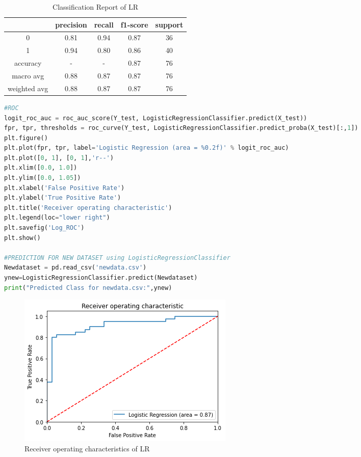 \begin{table}[h!]
    \centering
    \caption{Classification Report of LR}
    \label{tab:_ex_tab}
    \begin{tabular}{ccccc}     
        \toprule
            &  precision & recall & f1-score & support \\
        \midrule
        0 & 0.81 & 0.94 & 0.87 & 36 \\
        1 & 0.94 & 0.80 & 0.86 & 40 \\

        accuracy & - & - & 0.87 & 76 \\
        macro avg & 0.88 & 0.87 & 0.87 & 76 \\
        weighted avg & 0.88 & 0.87 & 0.87 & 76 \\
        \bottomrule
    \end{tabular}
\end{table}

\begin{lstlisting}[language=Python, label=list:python_code_ex]
#ROC
logit_roc_auc = roc_auc_score(Y_test, LogisticRegressionClassifier.predict(X_test))
fpr, tpr, thresholds = roc_curve(Y_test, LogisticRegressionClassifier.predict_proba(X_test)[:,1])
plt.figure()
plt.plot(fpr, tpr, label='Logistic Regression (area = %0.2f)' % logit_roc_auc)
plt.plot([0, 1], [0, 1],'r--')
plt.xlim([0.0, 1.0])
plt.ylim([0.0, 1.05])
plt.xlabel('False Positive Rate')
plt.ylabel('True Positive Rate')
plt.title('Receiver operating characteristic')
plt.legend(loc="lower right")
plt.savefig('Log_ROC')
plt.show()

#PREDICTION FOR NEW DATASET using LogisticRegressionClassifier
Newdataset = pd.read_csv('newdata.csv')
ynew=LogisticRegressionClassifier.predict(Newdataset)
print("Predicted Class for newdata.csv:",ynew)
\end{lstlisting}

\begin{figure}
    \centering
    \includegraphics[width=0.5\linewidth]{LR.png}
    \caption{Receiver operating characteristics of LR}
    \label{fig:enter-label}
\end{figure}

